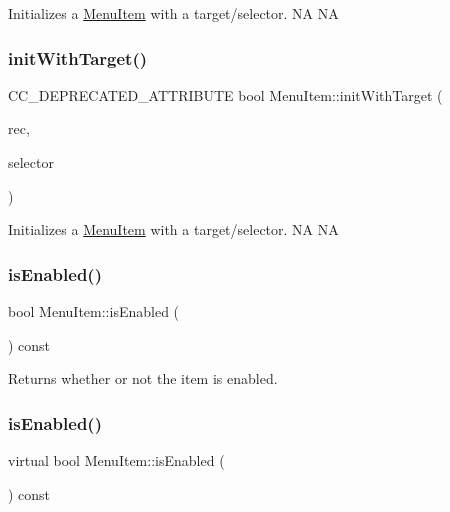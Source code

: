 Initializes a \hyperlink{classMenuItem}{Menu\+Item} with a target/selector.  NA  NA \mbox{\label{classMenuItem_a0030ed4ade25f001737c32cc5f694a52}} 
\subsubsection{\texorpdfstring{init\+With\+Target()}{initWithTarget()}\hspace{0.1cm}{\footnotesize\ttfamily [2/2]}}
{\footnotesize\ttfamily C\+C\+\_\+\+D\+E\+P\+R\+E\+C\+A\+T\+E\+D\+\_\+\+A\+T\+T\+R\+I\+B\+U\+TE bool Menu\+Item\+::init\+With\+Target (\begin{DoxyParamCaption}\item[{\hyperlink{classRef}{Ref} $\ast$}]{rec,  }\item[{S\+E\+L\+\_\+\+Menu\+Handler}]{selector }\end{DoxyParamCaption})}

Initializes a \hyperlink{classMenuItem}{Menu\+Item} with a target/selector.  NA  NA \mbox{\label{classMenuItem_a893ac64d6895430aa4ec34bc3051f900}} 
\subsubsection{\texorpdfstring{is\+Enabled()}{isEnabled()}\hspace{0.1cm}{\footnotesize\ttfamily [1/2]}}
{\footnotesize\ttfamily bool Menu\+Item\+::is\+Enabled (\begin{DoxyParamCaption}{ }\end{DoxyParamCaption}) const\hspace{0.3cm}{\ttfamily [virtual]}}

Returns whether or not the item is enabled. \mbox{\label{classMenuItem_ad55ab1194b24473df5fef4ae12ac22f7}} 
\subsubsection{\texorpdfstring{is\+Enabled()}{isEnabled()}\hspace{0.1cm}{\footnotesize\ttfamily [2/2]}}
{\footnotesize\ttfamily virtual bool Menu\+Item\+::is\+Enabled (\begin{DoxyParamCaption}{ }\end{DoxyParamCaption}) const\hspace{0.3cm}{\ttfamily [virtual]}}

